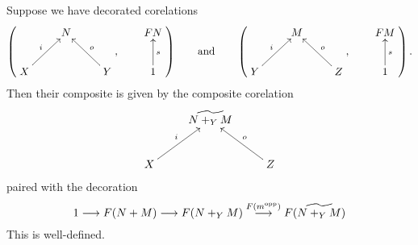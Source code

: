 Suppose we have decorated corelations
  \[
    \left(
    \begin{aligned}
      \xymatrix{
	& N \\  
	X \ar[ur]^{i} && Y \ar[ul]_{o}
      }
    \end{aligned}
    ,
    \qquad
    \begin{aligned}
      \xymatrix{
	FN \\
	1 \ar[u]_{s}
      }
    \end{aligned}
    \right)
    \qquad
    \mbox{and}
    \qquad
    \left(
    \begin{aligned}
      \xymatrix{
	& M \\  
	Y \ar[ur]^{i} && Z \ar[ul]_{o}
      }
    \end{aligned}
    ,
    \qquad
    \begin{aligned}
      \xymatrix{
	FM \\
	1 \ar[u]_{s}
      }
    \end{aligned}
    \right).
  \]
  Then their composite is given by the composite corelation
  \[
    \xymatrix{
      & \widetilde{N+_YM} \\  
      X \ar[ur]^{i} && Z \ar[ul]_{o}
    }
  \]
  paired with the decoration
  \[
    1 \longrightarrow F(N+M) \longrightarrow F(N+_YM) \stackrel{F(m^{\mathrm{opp}})}\longrightarrow F(\widetilde{N+_YM})
  \]
  This is well-defined.

